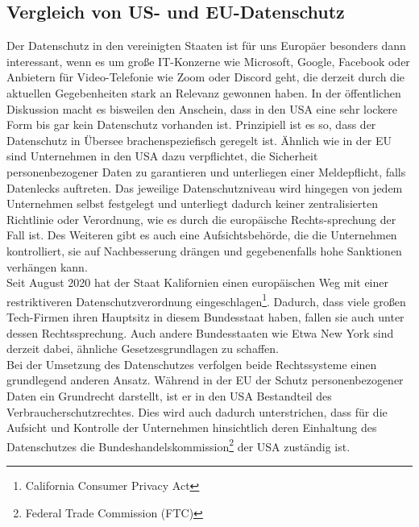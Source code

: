 \subsection{Vergleich von US- und EU-Datenschutz}
    Der Datenschutz in den vereinigten Staaten ist für uns Europäer besonders dann interessant, wenn es um große IT-Konzerne wie Microsoft, Google, Facebook oder Anbietern für Video-Telefonie wie Zoom oder Discord geht, die derzeit durch die aktuellen Gegebenheiten stark an Relevanz gewonnen haben. In der öffentlichen Diskussion macht es bisweilen den Anschein, dass in den USA eine sehr lockere Form bis gar kein Datenschutz vorhanden ist. Prinzipiell ist es so, dass der Datenschutz in Übersee brachenspeziefisch geregelt ist. Ähnlich wie in der EU sind Unternehmen in den USA dazu verpflichtet, die Sicherheit personenbezogener Daten zu garantieren und unterliegen einer Meldepflicht, falls Datenlecks auftreten. Das jeweilige Datenschutzniveau wird hingegen von jedem Unternehmen selbst festgelegt und unterliegt dadurch keiner zentralisierten Richtlinie oder Verordnung, wie es durch die europäische Rechts-sprechung der Fall ist. Des Weiteren gibt es auch eine Aufsichtsbehörde, die die Unternehmen kontrolliert, sie auf Nachbesserung drängen und gegebenenfalls hohe Sanktionen verhängen kann.\\
    Seit August 2020 hat der Staat Kalifornien einen \glqq europäischen Weg\grqq{} mit einer restriktiveren Datenschutzverordnung eingeschlagen\footnote{California Consumer Privacy Act}. Dadurch, dass viele großen Tech-Firmen ihren Hauptsitz in diesem Bundesstaat haben, fallen sie auch unter dessen Rechtssprechung. Auch andere Bundesstaaten wie Etwa New York sind derzeit dabei, ähnliche Gesetzesgrundlagen zu schaffen.\\
    Bei der Umsetzung des Datenschutzes verfolgen beide Rechtssysteme einen grundlegend anderen Ansatz. Während in der EU der Schutz personenbezogener Daten ein Grundrecht darstellt, ist er in den USA Bestandteil des Verbraucherschutzrechtes. Dies wird auch dadurch unterstrichen, dass für die Aufsicht und Kontrolle der Unternehmen hinsichtlich deren Einhaltung des Datenschutzes die Bundeshandelskommission\footnote{Federal Trade Commission (FTC)} der USA zuständig ist.\\
